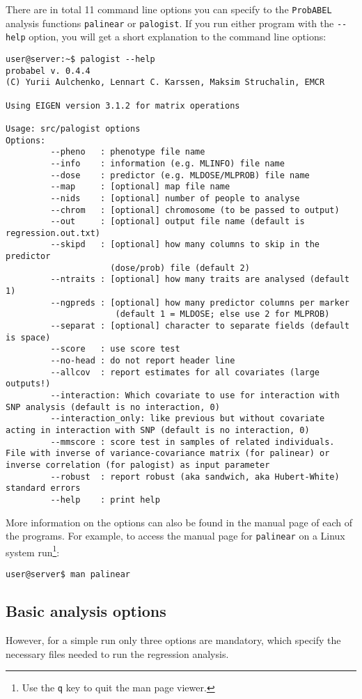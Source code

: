 \documentclass[12pt,a4paper]{article}
\newcommand{\PA}{\texttt{ProbABEL}}
\begin{document}
There are in total 11 command line options you can specify to the
\PA{} analysis functions \texttt{palinear} or \texttt{palogist}. If
you run either program with the \lstinline{--help} option, you will get a
short explanation to the command line options:
\begin{verbatim}
user@server:~$ palogist --help
probabel v. 0.4.4
(C) Yurii Aulchenko, Lennart C. Karssen, Maksim Struchalin, EMCR

Using EIGEN version 3.1.2 for matrix operations

Usage: src/palogist options
Options:
         --pheno   : phenotype file name
         --info    : information (e.g. MLINFO) file name
         --dose    : predictor (e.g. MLDOSE/MLPROB) file name
         --map     : [optional] map file name
         --nids    : [optional] number of people to analyse
         --chrom   : [optional] chromosome (to be passed to output)
         --out     : [optional] output file name (default is regression.out.txt)
         --skipd   : [optional] how many columns to skip in the predictor
                     (dose/prob) file (default 2)
         --ntraits : [optional] how many traits are analysed (default 1)
         --ngpreds : [optional] how many predictor columns per marker
                      (default 1 = MLDOSE; else use 2 for MLPROB)
         --separat : [optional] character to separate fields (default is space)
         --score   : use score test
         --no-head : do not report header line
         --allcov  : report estimates for all covariates (large outputs!)
         --interaction: Which covariate to use for interaction with SNP analysis (default is no interaction, 0)
         --interaction_only: like previous but without covariate acting in interaction with SNP (default is no interaction, 0)
         --mmscore : score test in samples of related individuals. File with inverse of variance-covariance matrix (for palinear) or inverse correlation (for palogist) as input parameter
         --robust  : report robust (aka sandwich, aka Hubert-White) standard errors
         --help    : print help
\end{verbatim}
More information on the options can also be found in the manual page
of each of the programs. For example, to access the manual page for
\texttt{palinear} on a Linux system run\footnote{Use the \texttt{q}
  key to quit the man page viewer.}:
\begin{verbatim}
user@server$ man palinear
\end{verbatim}


\subsection{Basic analysis options}
However, for a simple run only three options are mandatory, which
specify the necessary files needed to run the regression analysis.
\end{document}
